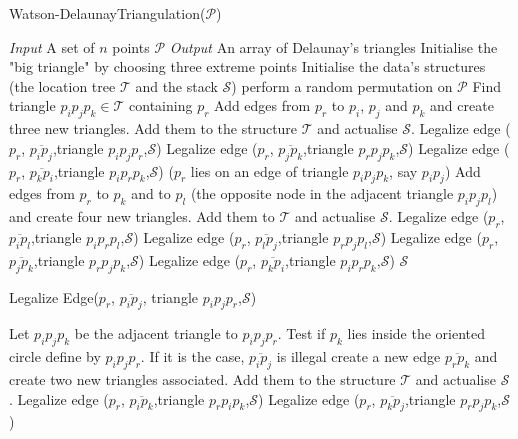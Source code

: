 \begin{algorithm}
\caption{Watson-DelaunayTriangulation($\mathcal{P}$)}\label{Delaunay}
\begin{algorithmic}[1]
\State \textit{Input} A set of $n$ points $\mathcal{P}$
\State \textit{Output} An array of Delaunay's triangles
\State Initialise the "big triangle" by choosing three extreme points 
\State Initialise the data's structures (the location tree $\mathcal{T}$ and the stack $\mathcal{S}$)
\State perform a random permutation on $\mathcal{P}$
\State Find triangle $p_ip_jp_k \in \mathcal{T}$ containing $p_r$
\State Add edges from $p_r$ to $p_i$, $p_j$ and $p_k$ and create three new triangles. Add them to the structure $\mathcal{T}$ and actualise $\mathcal{S}$.
\State Legalize edge ($p_r$, $\overline{p_ip_j}$,triangle $p_ip_jp_r$,$\mathcal{S}$)
\State Legalize edge ($p_r$, $\overline{p_jp_k}$,triangle $p_rp_jp_k$,$\mathcal{S}$)
\State Legalize edge ($p_r$, $\overline{p_kp_i}$,triangle $p_ip_rp_k$,$\mathcal{S}$)
\Else ($p_r$ lies on an edge of triangle $p_ip_jp_k$, say $p_ip_j$)
\State Add edges from $p_r$ to $p_k$ and to $p_l$ (the opposite node in the adjacent triangle $p_ip_jp_l$) and create four new triangles. Add them to $\mathcal{T}$ and actualise $\mathcal{S}$.
\State Legalize edge ($p_r$, $\overline{p_ip_l}$,triangle $p_ip_rp_l$,$\mathcal{S}$)
\State Legalize edge ($p_r$, $\overline{p_lp_j}$,triangle $p_rp_jp_l$,$\mathcal{S}$)
\State Legalize edge ($p_r$, $\overline{p_jp_k}$,triangle $p_rp_jp_k$,$\mathcal{S}$)
\State Legalize edge ($p_r$, $\overline{p_kp_i}$,triangle $p_ip_rp_k$,$\mathcal{S}$)
\EndIf
\EndFor
\Return $\mathcal{S}$
\end{algorithmic}
\end{algorithm}

\begin{algorithm}
\caption{Legalize Edge($p_r$, $\overline{p_ip_j}$, triangle $p_ip_jp_r$,$\mathcal{S}$)} \label{legalizeEdge}
\begin{algorithmic}[1]
\State Let $p_ip_jp_k$ be the adjacent triangle to $p_ip_jp_r$. Test if $p_k$ lies inside the oriented circle define by $p_ip_jp_r$. If it is the case, $\overline{p_ip_j}$ is illegal 
\State create a new edge $\overline{p_rp_k}$ and create two new triangles associated. Add them to the structure $\mathcal{T}$ and actualise $\mathcal{S}$.
\State Legalize edge ($p_r$, $\overline{p_ip_k}$,triangle $p_rp_ip_k$,$\mathcal{S}$)
\State Legalize edge ($p_r$, $\overline{p_kp_j}$,triangle $p_rp_jp_k$,$\mathcal{S}$)
\EndIf
\end{algorithmic}
\end{algorithm}

